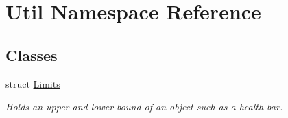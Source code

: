 \hypertarget{namespace_util}{}\section{Util Namespace Reference}
\label{namespace_util}
\subsection*{Classes}
\begin{DoxyCompactItemize}
\item 
struct \hyperlink{struct_util_1_1_limits}{Limits}
\begin{DoxyCompactList}\small\item\em Holds an upper and lower bound of an object such as a health bar. \end{DoxyCompactList}\end{DoxyCompactItemize}
